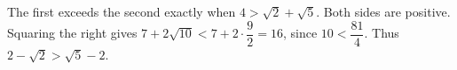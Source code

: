 The first exceeds the second exactly when $ 4>\sqrt2+\sqrt5 $. Both sides are positive. Squaring the right gives $ 7+2\sqrt{10}<7+2\cdot\dfrac{9}{2}=16 $, since $ 10<\dfrac{81}{4}$. Thus $\boxed{2-\sqrt2>\sqrt5-2}$.
